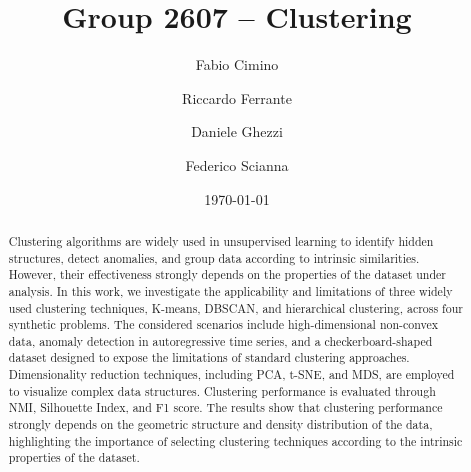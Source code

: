 \documentclass[prl,twocolumn]{revtex4-1}
\begin{document}
\title{Group 2607 -- Clustering}





\author{Fabio Cimino}
\author{Riccardo Ferrante}
\author{Daniele Ghezzi}
\author{Federico Scianna}

\date{\today}


\begin{abstract}
\noindent Clustering algorithms are widely used in unsupervised learning to identify hidden structures, detect anomalies, and group data according to intrinsic similarities.
However, their effectiveness strongly depends on the properties of the dataset under analysis.
In this work, we investigate the applicability and limitations of three widely used clustering techniques, K-means, DBSCAN, and hierarchical clustering, across four synthetic problems.
The considered scenarios include high-dimensional non-convex data, anomaly detection in autoregressive time series, and a checkerboard-shaped dataset designed to expose the limitations of standard clustering approaches.
Dimensionality reduction techniques, including PCA, t-SNE, and MDS, are employed to visualize complex data structures.
Clustering performance is evaluated through NMI, Silhouette Index, and F1 score.
The results show that clustering performance strongly depends on the geometric structure and density distribution of the data, highlighting the importance of selecting clustering techniques according to the intrinsic properties of the dataset.
\end{abstract}

\maketitle
\end{document}

